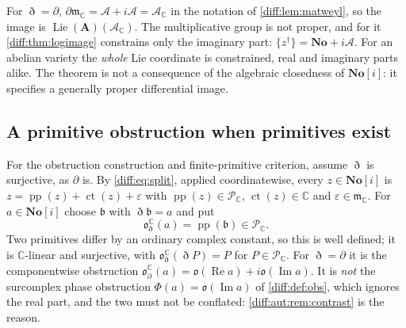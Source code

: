 \documentclass[11pt,letterpaper]{article}
\numberwithin{equation}{section}
\theoremstyle{definition}
\theoremstyle{remark}
\newcommand{\No}{\mathbf{No}}
\newcommand{\SC}{\mathbf{No}[i]}
\newcommand{\C}{\mathbb C}
\newcommand{\der}{\partial}
\newcommand{\mm}{\mathfrak m}
\newcommand{\Pcl}{\mathcal P}
\newcommand{\Acl}{\mathcal A}
\newcommand{\Obs}{\mathfrak o}
\newcommand{\pp}{\operatorname{pp}}
\newcommand{\ct}{\operatorname{ct}}
\newcommand{\Ree}{\operatorname{Re}}
\newcommand{\Imm}{\operatorname{Im}}
\newcommand{\Dn}{\eth}
\newcommand{\Lie}{\operatorname{Lie}}
\begin{document}
\begin{remark}
\label{diff:aut:rem:contrast}
For $\Dn=\der$, $\der\mm_{\C}=\Acl+i\Acl=\Acl_{\C}$ in the notation of
\cref{diff:lem:matweyl}, so the image is $\Lie(\mathbf A)(\Acl_{\C})$. The
multiplicative group is not proper, and for it \cref{diff:thm:logimage} constrains
only the imaginary part: $\{z^{\dagger}\}=\No+i\Acl$. For an abelian variety the
\emph{whole} Lie coordinate is constrained, real and imaginary parts alike. The
theorem is not a consequence of the algebraic closedness of $\SC$: it specifies a
generally proper differential image.
\end{remark}

\subsection{A primitive obstruction when primitives exist}
\label{diff:aut:sub:primitive}

For the obstruction construction and finite-primitive criterion, assume
$\Dn$ is surjective, as $\der$ is. By
\cref{diff:eq:split}, applied coordinatewise, every $z\in\SC$ is
$z=\pp(z)+\ct(z)+\varepsilon$ with $\pp(z)\in\Pcl_{\C}$, $\ct(z)\in\C$ and
$\varepsilon\in\mm_{\C}$. For $a\in\SC$ choose $\mathfrak b$ with $\Dn\mathfrak b=a$ and put
\begin{equation}\label{diff:aut:eq:Obsc}
 \Obs^{\C}_{\Dn}(a)=\pp(\mathfrak b)\in\Pcl_{\C}.
\end{equation}
Two primitives differ by an ordinary complex constant, so this is well defined;
it is $\C$-linear and surjective, with $\Obs^{\C}_{\Dn}(\Dn P)=P$ for
$P\in\Pcl_{\C}$. For $\Dn=\der$ it is the componentwise obstruction
$\Obs^{\C}_{\der}(a)=\Obs(\Ree a)+i\Obs(\Imm a)$. It is \emph{not} the surcomplex
phase obstruction $\Phi(a)=\Obs(\Imm a)$ of \cref{diff:def:obs}, which ignores the
real part, and the two must not be conflated: \cref{diff:aut:rem:contrast} is the
reason.
\end{document}
